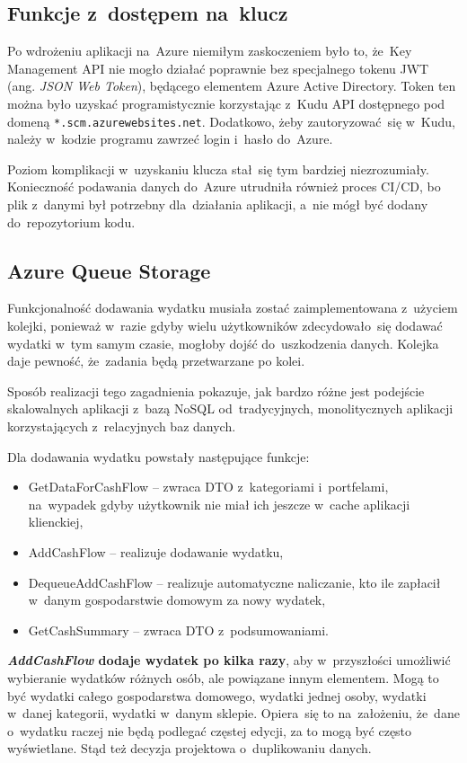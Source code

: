 \documentclass[12pt,a4paper,twoside,titlepage,openright]{book}
\begin{document}
\subsection{Funkcje z~dostępem na~klucz}

Po wdrożeniu aplikacji na~Azure niemiłym zaskoczeniem było to, że~Key Management API nie mogło działać poprawnie bez specjalnego tokenu JWT (ang. \textit{JSON Web Token}), będącego elementem Azure Active Directory. Token ten można było uzyskać programistycznie korzystając z~Kudu API dostępnego pod domeną \texttt{*.scm.azurewebsites.net}. Dodatkowo, żeby zautoryzować~się w~Kudu, należy w~kodzie programu zawrzeć login i~hasło do~Azure. 

Poziom komplikacji w~uzyskaniu klucza stał~się tym bardziej niezrozumiały. Konieczność podawania danych do~Azure utrudniła również proces CI/CD, bo plik z~danymi był potrzebny dla~działania aplikacji, a~nie mógł być dodany do~repozytorium kodu.

\subsection{Azure Queue Storage}

Funkcjonalność dodawania wydatku musiała zostać zaimplementowana z~użyciem kolejki, ponieważ w~razie gdyby wielu użytkowników zdecydowało~się dodawać wydatki w~tym samym czasie, mogłoby dojść do~uszkodzenia danych. Kolejka daje pewność, że~zadania będą przetwarzane po kolei.

Sposób realizacji tego zagadnienia pokazuje, jak bardzo różne jest podejście skalowalnych aplikacji z~bazą NoSQL od~tradycyjnych, monolitycznych aplikacji korzystających z~relacyjnych baz danych.

Dla dodawania wydatku powstały następujące funkcje:
\begin{itemize}
\item GetDataForCashFlow -- zwraca DTO z~kategoriami i~portfelami, na~wypadek gdyby użytkownik nie miał ich jeszcze w~cache aplikacji klienckiej,
\item AddCashFlow -- realizuje dodawanie wydatku,
\item DequeueAddCashFlow -- realizuje automatyczne naliczanie, kto ile zapłacił w~danym gospodarstwie domowym za nowy wydatek,
\item GetCashSummary -- zwraca DTO z~podsumowaniami.
\end{itemize}

\textbf{\textit{AddCashFlow} dodaje wydatek po kilka razy}, aby w~przyszłości umożliwić wybieranie wydatków różnych osób, ale powiązane innym elementem. Mogą to być wydatki całego gospodarstwa domowego, wydatki jednej osoby, wydatki w~danej kategorii, wydatki w~danym sklepie. Opiera~się to na~założeniu, że~dane o~wydatku raczej nie będą podlegać częstej edycji, za to mogą być często wyświetlane. Stąd też decyzja projektowa o~duplikowaniu danych.
\end{document}
